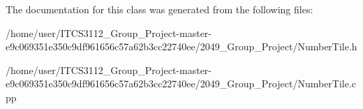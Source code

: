 The documentation for this class was generated from the following files\+:\begin{DoxyCompactItemize}
\item 
/home/user/\+I\+T\+C\+S3112\+\_\+\+Group\+\_\+\+Project-\/master-\/e9c069351e350c9df961656c57a62b3cc22740ee/2049\+\_\+\+Group\+\_\+\+Project/Number\+Tile.\+h\item 
/home/user/\+I\+T\+C\+S3112\+\_\+\+Group\+\_\+\+Project-\/master-\/e9c069351e350c9df961656c57a62b3cc22740ee/2049\+\_\+\+Group\+\_\+\+Project/Number\+Tile.\+cpp\end{DoxyCompactItemize}
